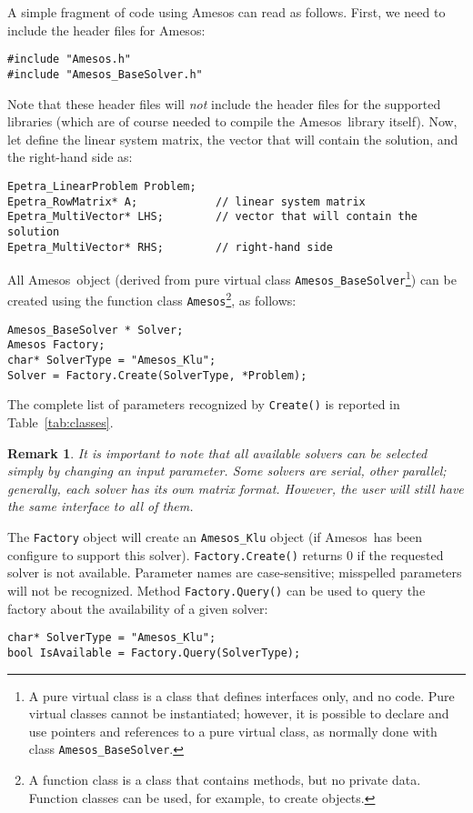 \documentclass[11pt]{SANDreport}
\newcommand{\amesos}{{\sc Amesos}}
\newtheorem{remark}{Remark}
\begin{document}
A simple fragment of code using Amesos can read as follows. First,
  we need to include the header files for Amesos:
\begin{verbatim}
#include "Amesos.h"
#include "Amesos_BaseSolver.h"
\end{verbatim}
Note that these header files will {\sl not} include the header files
for the supported libraries (which are of course needed to compile the
\amesos\ library itself). Now, let define the linear system matrix, the
vector that will contain the solution, and the right-hand side as:
\begin{verbatim}
Epetra_LinearProblem Problem;
Epetra_RowMatrix* A;            // linear system matrix
Epetra_MultiVector* LHS;        // vector that will contain the solution
Epetra_MultiVector* RHS;        // right-hand side
\end{verbatim}

All \amesos\ object (derived from pure virtual class 
\verb!Amesos_BaseSolver!\footnote{A pure virtual class is a class that
defines interfaces only, and no code. Pure virtual classes cannot
be instantiated; however, it is possible to declare and use pointers and
references to a pure virtual class, as normally done with class
{\tt Amesos\_BaseSolver}.})
can be created using the function class \verb!Amesos!\footnote{A function
class is a class that contains methods, but no private data. Function
classes can be used, for example, to create objects.}, as follows:
\begin{verbatim}
Amesos_BaseSolver * Solver;
Amesos Factory;
char* SolverType = "Amesos_Klu";
Solver = Factory.Create(SolverType, *Problem);
\end{verbatim}
The complete list of parameters recognized by \verb!Create()! is reported
in Table~\ref{tab:classes}.

\begin{remark}
It is important to note that all available solvers can be selected
simply by changing an input parameter. Some solvers are serial, other
parallel; generally, each solver has its own matrix format. However, the
user will still have the {\em same} interface to all of them.
\end{remark}

The \verb!Factory! object will create an \verb!Amesos_Klu! object (if \amesos\
has been configure to support this solver). \verb!Factory.Create()! 
returns 0 if the requested solver is not available. Parameter names 
are case-sensitive; misspelled parameters 
will not be recognized. Method
\verb!Factory.Query()! can be used to query the factory about the
availability of a given solver:
\begin{verbatim}
char* SolverType = "Amesos_Klu";
bool IsAvailable = Factory.Query(SolverType);
\end{verbatim}
\end{document}
